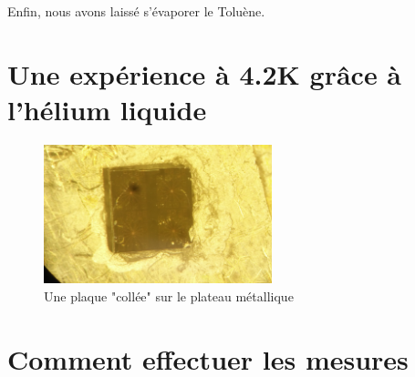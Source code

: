 Enfin, nous avons laissé s’évaporer le Toluène.
\section{Une expérience à 4.2K grâce à l'hélium liquide}
\begin{figure}[h]
    \begin{center}
        \includegraphics[width=250px]{Images/PhotoPlaqueTransistors}
        \caption{Une plaque "collée" sur le plateau métallique}
        \label{fig:}
    \end{center}
\end{figure}
\section{Comment effectuer les mesures}
